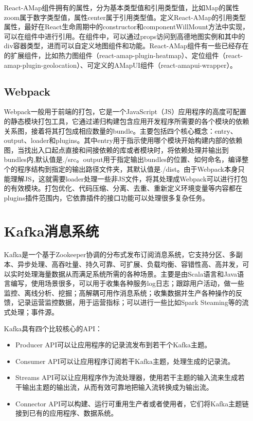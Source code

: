 React-AMap组件拥有的属性，分为基本类型值和引用类型值，比如Map的属性zoom属于数字类型值，属性center属于引用类型值。定义React-AMap的引用类型属性，最好在React生命周期中的constructor和componentWillMount方法中实现，可以在组件中进行引用\cite{hhl2011}。在组件中，可以通过props访问到高德地图实例和其中的div容器类型，进而可以自定义地图组件和功能。React-AMap组件有一些已经存在的扩展组件，比如热力图组件（react-amap-plugin-heatmap）、定位组件（react-amap-plugin-geolocation）、可定义的AMapUI组件（react-amapui-wrapper）。\\

\subsection{Webpack}
Webpack一般用于前端的打包，它是一个JavaScript（JS）应用程序的高度可配置的静态模块打包工具，它通过递归构建包含应用开发程序所需要的各个模块的依赖关系图，接着将其打包成相应数量的bundle。主要包括四个核心概念：entry、output、loader和plugins。其中entry用于指示使用哪个模块开始构建内部的依赖图，当找出入口起点直接和间接依赖的库或者模块时，将依赖处理并输出到bundles内,默认值是./src。output用于指定输出bundles的位置、如何命名，编译整个的程序结构到指定的输出路径文件夹，其默认值是./dist。由于Webpack本身只能理解JS，这就需要loader处理一些非JS文件，将其处理成Webpack可以进行打包的有效模块。打包优化、代码压缩、分离、去重、重新定义环境变量等内容都在plugins插件范围内，它依靠插件的接口功能可以处理很多复杂任务。

\section{Kafka消息系统}
Kafka是一个基于Zookeeper协调的分布式发布订阅消息系统，它支持分区、多副本、异步处理、高吞吐量、持久可靠、可扩展、负载均衡、容错性高、高并发，可以实时处理海量数据从而满足系统所需的各种场景。主要是由Scala语言和Java语言编写，使用场景很多，可以用于收集各种服务log日志；跟踪用户活动，做一些监控、离线分析、挖掘；高解耦可用作消息系统；收集数据并生产各种操作的反馈，记录运营监控数据，用于运营指标；可以进行一些比如Spark Steaming等的流式处理；事件源\cite{lb2019kafka}。

Kafka具有四个比较核心的API：
\begin{itemize}
    \item Producer API可以让应用程序的记录流发布到若干个Kafka主题。
    \item Consumer API可以让应用程序订阅若干Kafka主题，处理生成的记录流。
    \item Streams API可以让应用程序作为流处理器，使用若干主题的输入流来生成若干输出主题的输出流，从而有效可靠地把输入流转换成为输出流。
    \item Connector API可以构建、运行可重用生产者或者使用者，它们将Kafka主题链接到已有的应用程序、数据系统。
\end{itemize}

